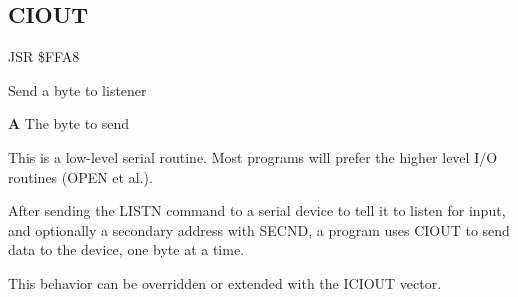
\newpage
\subsection{CIOUT}
\label{KERNAL Jump Table!CIOUT}
\begin{description}[leftmargin=2cm,style=nextline]
    \item [Address:] JSR \$FFA8
    \item [Description:] Send a byte to listener
    \item [Inputs:]
        \textbf{A} The byte to send
    \item [Remarks:]
        This is a low-level serial routine. Most programs will prefer the higher level I/O routines (OPEN et al.).

        After sending the LISTN command to a serial device to tell it to listen for input, and optionally a secondary address with SECND, a program uses CIOUT to send data to the device, one byte at a time.

        This behavior can be overridden or extended with the ICIOUT vector.
    \item [Example:]
\end{description}



\newpage
